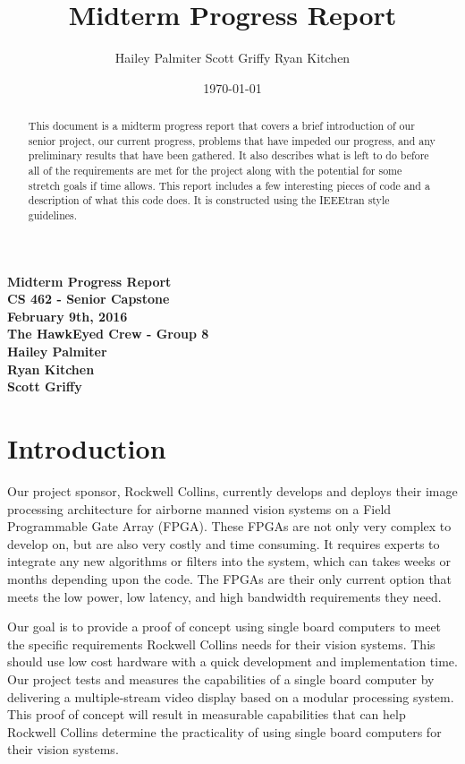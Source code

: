 \documentclass[letterpaper,10pt,titlepage]{IEEEtran}
\title{Midterm Progress Report}
\author{Hailey Palmiter Scott Griffy Ryan Kitchen}
\date{\today}
\begin{document}
   \begin{titlepage}
      \centering
      \vfill
      {\bfseries\Large
         Midterm Progress Report \\
         CS 462 - Senior Capstone\\
         \vskip2cm
         February 9th, 2016\\
         \vskip2cm
         The HawkEyed Crew - Group 8\\ 
         \vskip1cm
         Hailey Palmiter\\
         \vskip1cm
         Ryan Kitchen\\
         \vskip1cm
         Scott Griffy\\
    
      }
      \vfill
      \vskip2cm
      \begin{abstract}
      This document is a midterm progress report that covers a brief introduction of our senior project, our current progress, problems that have impeded our progress, and any preliminary results that have been gathered. It also describes what is left to do before all of the requirements are met for the project along with the potential for some stretch goals if time allows. This report includes a few interesting pieces of code and a description of what this code does. It is constructed using the IEEEtran style guidelines.
      \end{abstract}
      \vfill
   \end{titlepage}
   
   \onecolumn
   \tableofcontents
   \newpage
   \bigskip
   \section{Introduction}
   Our project sponsor, Rockwell Collins, currently develops and deploys their image processing architecture for airborne manned vision systems on a Field Programmable Gate Array (FPGA).  These FPGAs are not only very complex to develop on, but are also very costly and time consuming. It requires experts to integrate any new algorithms or filters into the system, which can takes weeks or months depending upon the code. The FPGAs are their only current option that meets the low power, low latency, and high bandwidth requirements they need.\\ 
\par
Our goal is to provide a proof of concept using single board computers to meet the specific requirements Rockwell Collins needs for their vision systems. This should use low cost hardware with a quick development and implementation time. Our project tests and measures the capabilities of a single board computer by delivering a multiple-stream video display based on a modular processing system. This proof of concept will result in measurable capabilities that can help Rockwell Collins determine the practicality of using single board computers for their vision systems.
\end{document}
